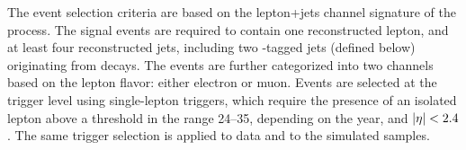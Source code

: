 The event selection criteria are based on the lepton+jets channel signature of the \ttbar process.
The signal events are required to contain one reconstructed lepton, and at least four reconstructed jets, including two \PQb-tagged jets (defined below) originating from \ttbar decays.
The events are further categorized into two channels based on the lepton flavor: either electron or muon.
Events are selected at the trigger level using single-lepton triggers, which require the presence of an isolated lepton above a \PT threshold in the range 24--35\GeV, depending on the year, and $\lvert \eta \rvert < 2.4$.
The same trigger selection is applied to data and to the simulated samples.
